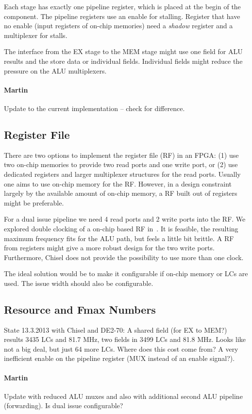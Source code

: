 \documentclass{IEEEtran}
\newcommand{\comment}[3]{\paragraph*{\textbf{#1}}{\color{#3}#2}}
\newcommand{\martin}[1]{\comment{Martin}{#1}{Blue}}
\begin{document}
Each stage has exactly one pipeline register, which is placed at the begin
of the component. The pipeline registers use an enable for stalling.
Register that have no enable (input registers of on-chip memories) need
a \emph{shadow} register and a multiplexer for stalls.

The interface from the EX stage to the MEM stage might use one
field for ALU results and the store data or individual fields. Individual
fields might reduce the pressure on the ALU multiplexers.
\martin{Update to the current implementation -- check for difference.}


\subsection{Register File}

There are two options to implement the register file (RF) in an FPGA: (1) use
two on-chip memories to provide two read ports and one write port, or (2)
use dedicated registers and larger multiplexer structures for the read
ports. Usually one aims to use on-chip memory for the RF. However,
in a design constraint largely by the available amount of on-chip memory,
a RF built out of registers might be preferable.

For a dual issue pipeline we need 4 read ports and 2 write ports into the RF.
We explored double clocking of a on-chip based RF in~\cite{patmos:ppes2011}.
It is feasible, the resulting maximum frequency fits for the ALU path, but feels
a little bit brittle. A RF from registers might give a more robust design for the
two write ports. Furthermore, Chisel does not provide the possibility to use
more than one clock.

The ideal solution would be to make it configurable if on-chip memory or
LCs are used. The issue width should also be configurable.




\subsection{Resource and Fmax Numbers}

State 13.3.2013 with Chisel and DE2-70: A shared field (for EX to MEM?) results 3435 LCs
and 81.7 MHz, two fields in 3499 LCs and 81.8 MHz. Looks like not a big deal,
but just 64 more LCs. Where does this cost come from? A very inefficient
enable on the pipeline register (MUX instead of an enable signal?).

\martin{Update with reduced ALU muxes and also with additional second
ALU pipeline (forwarding). Is dual issue configurable?}
\end{document}

